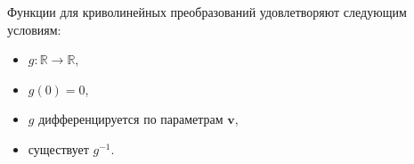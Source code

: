 \documentclass[12pt,twoside]{article}
\newcommand{\bv}{\mathbf{v}}
\begin{document}
Функции для криволинейных преобразований удовлетворяют следующим условиям:
\begin{itemize}
    \item $g: \mathbb{R} \to \mathbb{R}$,
    \item $g(0) = 0$,
    \item $g$ дифференцируется по параметрам $\bv$,
    \item существует $g^{-1}$.
\end{itemize}
\end{document}
